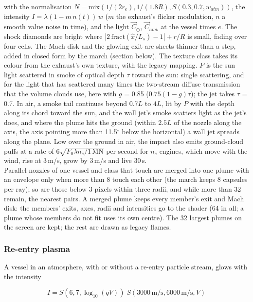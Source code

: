 \documentclass[Orbiter Technical Reference.tex]{subfiles}
\begin{document}
\begin{sloppypar}
\noindent
with the normalisation $N = \mathrm{mix}(1/(2r_{e}), 1/(1.8R), S(0.3, 0.7, w_{atm}))$, the intensity $I = \lambda(1 - m\,n(t))\,w$ ($m$ the exhaust's flicker modulation, $n$ a smooth value noise in time), and the light $\vec{C}_{\odot}$, $\vec{C}_{amb}$ at the vessel times $e$. The shock diamonds are bright where $|2\,\mathrm{fract}(\hat{x}/L_{s}) - 1| + r/R$ is small, fading over four cells. The Mach disk and the glowing exit are sheets thinner than a step, added in closed form by the march (section below). The texture class takes its colour from the exhaust's own texture, with the legacy mapping. $P$ is the sun light scattered in smoke of optical depth $\tau$ toward the sun: single scattering, and for the light that has scattered many times the two-stream diffuse transmission that the volume clouds use, here with $g$ = 0.85 ($0.75(1 - g)\tau$); the jet takes $\tau$ = 0.7. In air, a smoke tail continues beyond $0.7L$ to $4L$, lit by $P$ with the depth along its chord toward the sun, and the wall jet's smoke scatters light as the jet's does, and where the plume hits the ground (within $2.5L$ of the nozzle along the axis, the axis pointing more than 11.5$^{\circ}$ below the horizontal) a wall jet spreads along the plane. Low over the ground in air, the impact also emits ground-cloud puffs at a rate of $6\sqrt{F_{0}\lambda n_{e}/1\,\mathrm{MN}}$ per second for $n_{e}$ engines, which move with the wind, rise at 3\,m/s, grow by 3\,m/s and live 30\,s.\\
Parallel nozzles of one vessel and class that touch are merged into one plume with an envelope only when more than 8 touch each other (the march keeps 8 capsules per ray); so are those below 3 pixels within three radii, and while more than 32 remain, the nearest pairs. A merged plume keeps every member's exit and Mach disk: the members' exits, axes, radii and intensities go to the shader (64 in all; a plume whose members do not fit uses its own centre). The 32 largest plumes on the screen are kept; the rest are drawn as legacy flames.

\subsubsection{Re-entry plasma}
A vessel in an atmosphere, with or without a re-entry particle stream, glows with the intensity

\[ I = S(6, 7, \log_{10}(qV))\; S(3000\,\mathrm{m/s}, 6000\,\mathrm{m/s}, V) \]


\end{sloppypar}
\end{document}
